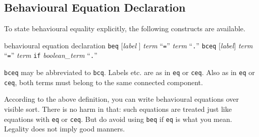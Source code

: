 \documentclass[a4paper]{memoir}
\begin{document}
\subsection{Behavioural Equation Declaration}\label{sec:p2-beh-eq-decl}

To state behavioural equality explicitly, the following constructs are
available.

\begin{bsyntax} behavioural equation declaration \Hline
{}
\texttt{beq} $[$\textit{label} $]$ \textit{term} ``\texttt{=}'' \textit{term} ``\texttt{.}''
\texttt{bceq} $[$\textit{label}$]$ \textit{term} ``\texttt{=}'' \textit{term} \texttt{if} \textit{boolean\_term} ``\texttt{.}''
\end{bsyntax}

\verb|bceq| may be abbreviated to \verb|bcq|.
Labels etc. are as in \verb|eq| or \verb|ceq|. Also as in \verb|eq|
or \verb|ceq|, both terms must belong to the same connected
component.

\begin{warning}
According to the above definition, you can write behavioural equations over
visible sort. There is no harm in that: such equations are treated
just like equations with \verb|eq| or \verb|ceq|.
But do avoid using \verb|beq| if \verb|eq| is what you mean.
Legality does not imply good manners.
\end{warning}
\end{document}

